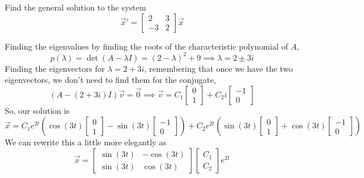 \begin{example}
	Find the general solution to the system
	\begin{equation*}
		\vec{x}' = \begin{bmatrix}
			2 & 3 \\
			-3 & 2
		\end{bmatrix} \vec{x}
	\end{equation*}
\end{example}
\noindent
Finding the eigenvalues by finding the roots of the characteristic polynomial of $A$,
\begin{equation*}
	p(\lambda) = \det{(A - \lambda I)} = (2-\lambda)^2 + 9 \implies \lambda = 2 \pm 3i
\end{equation*}
Finding the eigenvectors for $\lambda = 2 + 3i$, remembering that once we have the two eigenvectors, we don't need to find them for the conjugate,
\begin{equation*}
	(A - (2+3i)I)\vec{v} = \vec{0} \implies \vec{v} = C_1\begin{bmatrix}
		0 \\
		1
	\end{bmatrix} + C_2i\begin{bmatrix}
		-1 \\
		0
	\end{bmatrix}
\end{equation*}
So, our solution is
\begin{equation*}
	\vec{x} = C_1e^{2t}\left(\cos{(3t)}\begin{bmatrix}
		0 \\
		1
	\end{bmatrix}-\sin{(3t)}\begin{bmatrix}
		-1 \\
		0
	\end{bmatrix}\right) + C_2e^{2t}\left(\sin{(3t)}\begin{bmatrix}
		0 \\
		1
	\end{bmatrix}+\cos{(3t)}\begin{bmatrix}
		-1 \\
		0
	\end{bmatrix}\right)
\end{equation*}
We can rewrite this a little more elegantly as
\begin{equation*}
	\vec{x} = \begin{bmatrix}
		\sin{(3t)} & - \cos{(3t)} \\
		\sin{(3t)} & \cos{(3t)}
	\end{bmatrix} \begin{bmatrix}
		C_1 \\
		C_2
	\end{bmatrix} e^{2t}
\end{equation*}